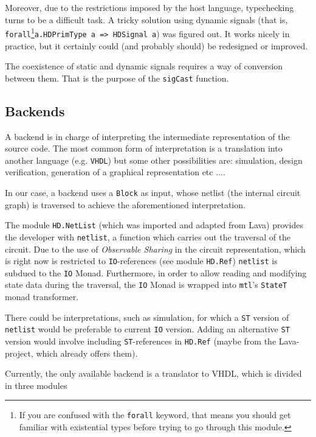 Moreover, due to the restrictions imposed by the host language,
typechecking turns to be a difficult task. A tricky solution using
dynamic signals (that is, \texttt{forall}\footnote{If you are confused
  with the \texttt{forall} keyword, that means you should 
  get familiar with existential types before trying to go through this
  module.}\texttt{a.HDPrimType a => HDSignal a}) was figured out. It
works nicely in practice, but it certainly could (and probably should)
be redesigned or improved.

The coexistence of static and dynamic signals requires a way of
conversion between them. That is the purpose of the \texttt{sigCast} function.

\subsection{Backends}
\label{backends}
A backend is in charge of interpreting the intermediate representation
of the source code. The most common form of interpretation is a
translation into another language (e.g.  \texttt{VHDL}) but some other
possibilities are: simulation, design verification, generation of a graphical
representation etc $\dots$. 

In our case, a backend uses a \texttt{Block} as input, whose netlist
(the internal circuit graph) is traversed to achieve the
aforementioned interpretation. 

The module \texttt{HD.NetList} (which was imported and adapted from
Lava) provides the developer with \texttt{netlist}, a function which
carries out the traversal of the circuit. Due to the use of
\textit{Observable Sharing} in the circuit representation, which is
right now is restricted to \texttt{IO}-references (see module
\texttt{HD.Ref}) \texttt{netlist} is subdued to the \texttt{IO} Monad.
Furthermore, in order to allow reading and modifying state data during
the traversal, the \texttt{IO} Monad is wrapped into \texttt{mtl}'s
\texttt{StateT} monad transformer.

There could be interpretations, such as simulation, for which a
\texttt{ST} version of \texttt{netlist} would be preferable to current
\texttt{IO} version. Adding an alternative \texttt{ST} version would
involve including \texttt{ST}-references in \texttt{HD.Ref} (maybe
from the Lava-project, which already offers them).

Currently, the only available backend is a translator to VHDL, which
is divided in three modules

